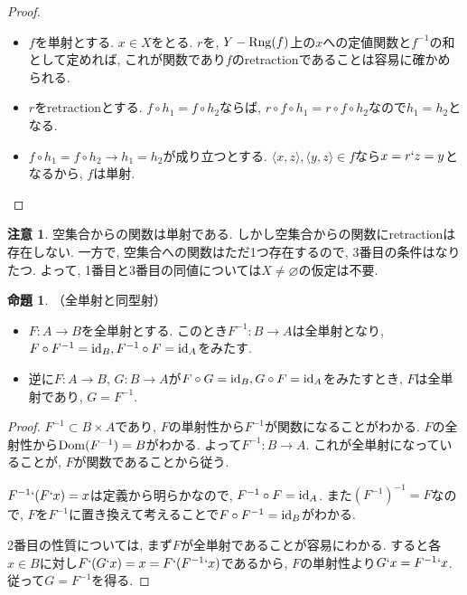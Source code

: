 \documentclass[a4paper, twoside]{bxjsarticle}
\theoremstyle{definition}
\newtheorem{prop}[thm]{命題}
\newtheorem{rem}[thm]{注意}
\begin{document}
        \begin{proof}
            \begin{itemize}
                \item $f$を単射とする. $x\in X$をとる. $r$を, $Y-{\rm Rng}(f)$上の$x$への定値関数と$f^{-1}$の和として定めれば, これが関数であり$f$のretractionであることは容易に確かめられる.
                \item $r$をretractionとする. $f\circ h_1 = f\circ h_2$ならば, $r\circ f\circ h_1 = r\circ f\circ h_2$なので$h_1 = h_2$となる.
                \item $f\circ h_1 = f\circ h_2 \to h_1 = h_2$が成り立つとする. $\langle x, z\rangle, \langle y, z\rangle \in f$なら$x = r`z = y$となるから, $f$は単射.
            \end{itemize}
        \end{proof}
        \begin{rem}
            空集合からの関数は単射である. しかし空集合からの関数にretractionは存在しない. 一方で, 空集合への関数はただ1つ存在するので, 3番目の条件はなりたつ. よって, 1番目と3番目の同値については$X\neq \varnothing$の仮定は不要.
        \end{rem}
        \begin{prop}
            （全単射と同型射）
            \begin{itemize}
                \item $F\colon A\to B$を全単射とする. このとき$F^{-1}\colon B\to A$は全単射となり, $F\circ F^{-1} = {\rm id}_B, F^{-1}\circ F = {\rm id}_A$をみたす.
                
                \item 逆に$F\colon A\to B$, $G\colon B\to A$が$F\circ G = {\rm id}_B, G\circ F={\rm id}_A$をみたすとき, $F$は全単射であり, $G=F^{-1}$.
            \end{itemize}
        \end{prop}
        \begin{proof}
            $F^{-1}\subset B\times A$であり, $F$の単射性から$F^{-1}$が関数になることがわかる. $F$の全射性から${\rm Dom}(F^{-1})=B$がわかる. よって$F^{-1}\colon B\to A$. これが全単射になっていることが, $F$が関数であることから従う.
            
            $F^{-1}`(F`x)=x$は定義から明らかなので, $F^{-1}\circ F = {\rm id}_A$. また$(F^{-1})^{-1} = F$なので, $F$を$F^{-1}$に置き換えて考えることで$F\circ F^{-1} = {\rm id}_B$がわかる.
            
            2番目の性質については, まず$F$が全単射であることが容易にわかる. すると各$x \in B$に対し$F`(G`x) = x = F`(F^{-1}`x)$であるから, $F$の単射性より$G`x = F^{-1}`x$. 従って$G=F^{-1}$を得る.
        \end{proof}
\end{document}
